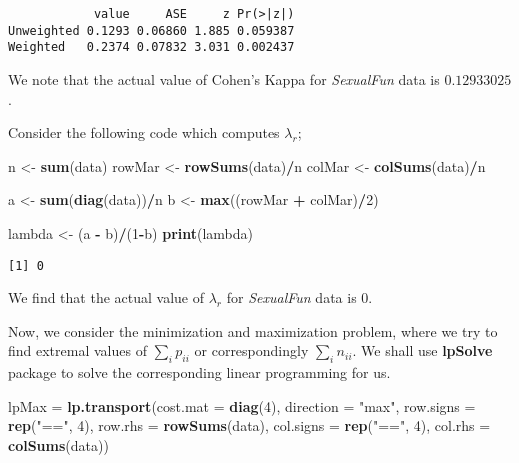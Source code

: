 \documentclass[]{article}
\newenvironment{Shaded}{\begin{snugshade}}{\end{snugshade}}
\newcommand{\KeywordTok}[1]{\textcolor[rgb]{0.13,0.29,0.53}{\textbf{#1}}}
\newcommand{\DataTypeTok}[1]{\textcolor[rgb]{0.13,0.29,0.53}{#1}}
\newcommand{\DecValTok}[1]{\textcolor[rgb]{0.00,0.00,0.81}{#1}}
\newcommand{\StringTok}[1]{\textcolor[rgb]{0.31,0.60,0.02}{#1}}
\newcommand{\OperatorTok}[1]{\textcolor[rgb]{0.81,0.36,0.00}{\textbf{#1}}}
\newcommand{\NormalTok}[1]{#1}
\begin{document}
\begin{verbatim}
            value     ASE     z Pr(>|z|)
Unweighted 0.1293 0.06860 1.885 0.059387
Weighted   0.2374 0.07832 3.031 0.002437
\end{verbatim}

We note that the actual value of Cohen's Kappa for \emph{SexualFun} data
is \(0.12933025\).

Consider the following code which computes \(\lambda_r\);

\begin{Shaded}
\begin{Highlighting}[]
\NormalTok{n <-}\StringTok{ }\KeywordTok{sum}\NormalTok{(data)}
\NormalTok{rowMar <-}\StringTok{ }\KeywordTok{rowSums}\NormalTok{(data)}\OperatorTok{/}\NormalTok{n}
\NormalTok{colMar <-}\StringTok{ }\KeywordTok{colSums}\NormalTok{(data)}\OperatorTok{/}\NormalTok{n}

\NormalTok{a <-}\StringTok{ }\KeywordTok{sum}\NormalTok{(}\KeywordTok{diag}\NormalTok{(data))}\OperatorTok{/}\NormalTok{n}
\NormalTok{b <-}\StringTok{ }\KeywordTok{max}\NormalTok{((rowMar }\OperatorTok{+}\StringTok{ }\NormalTok{colMar)}\OperatorTok{/}\DecValTok{2}\NormalTok{)}

\NormalTok{lambda <-}\StringTok{ }\NormalTok{(a }\OperatorTok{-}\StringTok{ }\NormalTok{b)}\OperatorTok{/}\NormalTok{(}\DecValTok{1}\OperatorTok{-}\NormalTok{b)}
\KeywordTok{print}\NormalTok{(lambda)}
\end{Highlighting}
\end{Shaded}

\begin{verbatim}
[1] 0
\end{verbatim}

We find that the actual value of \(\lambda_r\) for \emph{SexualFun} data
is \(0\).

Now, we consider the minimization and maximization problem, where we try
to find extremal values of \(\sum_i p_{ii}\) or correspondingly
\(\sum_i n_{ii}\). We shall use \textbf{lpSolve} package to solve the
corresponding linear programming for us.

\begin{Shaded}
\begin{Highlighting}[]
\NormalTok{lpMax =}\StringTok{ }\KeywordTok{lp.transport}\NormalTok{(}\DataTypeTok{cost.mat =} \KeywordTok{diag}\NormalTok{(}\DecValTok{4}\NormalTok{), }\DataTypeTok{direction =} \StringTok{"max"}\NormalTok{, }
             \DataTypeTok{row.signs =} \KeywordTok{rep}\NormalTok{(}\StringTok{"=="}\NormalTok{, }\DecValTok{4}\NormalTok{), }\DataTypeTok{row.rhs =} \KeywordTok{rowSums}\NormalTok{(data), }
             \DataTypeTok{col.signs =} \KeywordTok{rep}\NormalTok{(}\StringTok{"=="}\NormalTok{, }\DecValTok{4}\NormalTok{), }\DataTypeTok{col.rhs =} \KeywordTok{colSums}\NormalTok{(data))}
\end{Highlighting}
\end{Shaded}
\end{document}
